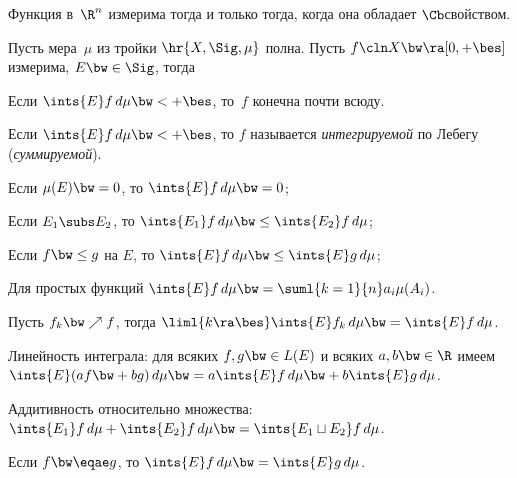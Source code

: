 \documentclass[a4paper]{article}
\begin{document}
\begin{theorem}[Лузина]
  Функция в~$\R^n$ измерима тогда и только тогда, когда она обладает $\Cb$\д свойством.
\end{theorem}

\begin{df}
  Пусть мера~$\mu$ из тройки $\hr{X,\Sig,\mu}$ полна.
  Пусть $f\cln X\bw\ra [0,+\bes]$ измерима, $E \bw\in \Sig$, тогда
\end{df}

\begin{note}
  Если $\ints{E}f\,d\mu \bw< +\bes$, то~$f$ конечна почти всюду.
\end{note}

\begin{df}
  Если $\ints{E}f\,d\mu\bw<+\bes$, то $f$ называется
  \emph{интегрируемой} по Лебегу (\emph{суммируемой}).
\end{df}

\begin{stm}
  \begin{items}{-3}
    \item Если $\mu(E) \bw= 0$, то $\ints{E} f\,d\mu \bw=0$;
    \item Если $E_1\subs E_2$, то $\ints{E_1}f\,d\mu \bw\le \ints{E_2}f\,d\mu$;
    \item Если $f \bw\le g$ на $E$, то $\ints{E}f\,d\mu \bw\le \ints{E}g\,d\mu$;
    \item Для простых функций $\ints{E}f\,d\mu \bw= \suml{k=1}{n} a_i\mu(A_i)$.
  \end{items}
\end{stm}

\begin{theorem}
Пусть $f_k \bw\nearrow f$, тогда $\liml{k\ra\bes} \ints{E} f_k\,d\mu \bw= \ints{E}f\,d\mu$.
\end{theorem}

\begin{stm}
  \begin{items}{-3}
    \item Линейность интеграла: для всяких $f,g \bw\in L(E)$ и всяких $a,b \bw\in \R$
          имеем $\ints{E}(af \bw+ bg)\,d\mu \bw= a\ints{E}f\,d\mu \bw+ b\ints{E}g\,d\mu$.
    \item Аддитивность относительно множества:
          $\ints{E_1}f\,d\mu + \ints{E_2}f\,d\mu \bw= \ints{E_1\sqcup E_2}f\,d\mu$.
    \item Если $f\bw\eqae g$, то $\ints{E}f\,d\mu \bw= \ints{E}g\,d\mu$.
  \end{items}
\end{stm}
\end{document}
